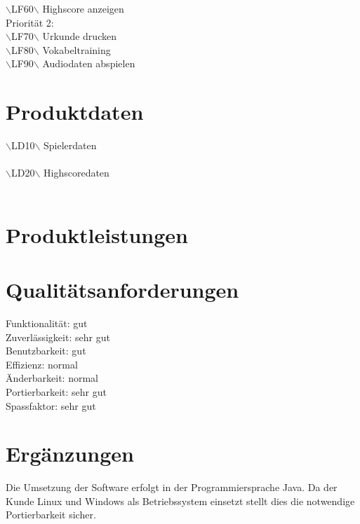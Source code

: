 \noindent $\backslash$LF60$\backslash$ \hspace{15 mm}Highscore anzeigen\\

\noindent Priorität 2:\\
\noindent$\backslash$LF70$\backslash$ \hspace{15 mm}Urkunde drucken\\
\noindent$\backslash$LF80$\backslash$ \hspace{15 mm}Vokabeltraining\\
\noindent$\backslash$LF90$\backslash$ \hspace{15 mm}Audiodaten abspielen \\ 


\section{Produktdaten} %
$\backslash$LD10$\backslash$ \hspace{15 mm}Spielerdaten \\ \\
\noindent $\backslash$LD20$\backslash$ \hspace{15 mm}Highscoredaten \\ \\

\section{Produktleistungen} %

\section{Qualitätsanforderungen} %
Funktionalität:	\hspace{15 mm}		gut\\
Zuverlässigkeit:\hspace{15 mm}		sehr gut\\
Benutzbarkeit:	\hspace{15 mm}		gut\\
Effizienz:	\hspace{15 mm}		normal\\
Änderbarkeit:	\hspace{15 mm}		normal\\
Portierbarkeit:	\hspace{15 mm}		sehr gut\\
Spassfaktor:	\hspace{15 mm}		sehr gut\\
\section{Ergänzungen} %
Die Umsetzung der Software erfolgt in der Programmiersprache Java. Da der Kunde Linux und Windows als Betriebssystem einsetzt stellt dies die notwendige Portierbarkeit sicher.


